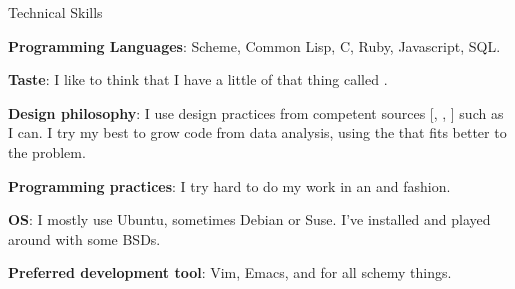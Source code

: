 \begin{rubric}{Technical Skills}{ 

    \entry* \textbf{Programming Languages}: Scheme, Common Lisp, C,
    Ruby, Javascript, SQL.

    \entry* \textbf{Taste}: I like to think that I have a little of that thing
    called .

    \entry* \textbf{Design philosophy}: I use design practices from
    competent sources
    [,
     ,
     ]
    such as I can. I try my best to grow code from data analysis,
    using the
    that fits better to the problem.

    \entry* \textbf{Programming practices}: I try hard to do my work in an
    and
    fashion.

    \entry* \textbf{OS}: I mostly use Ubuntu, sometimes Debian or Suse. I've
    installed and played around with some BSDs.

    \entry* \textbf{Preferred development tool}: Vim, Emacs, and
    for all schemy things. 

}\end{rubric}
